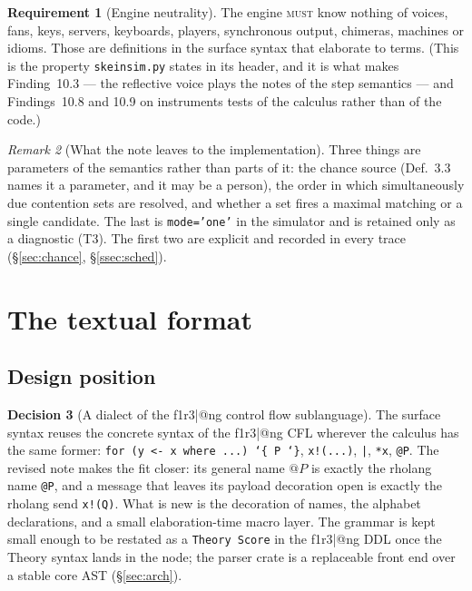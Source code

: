 \documentclass[11pt,a4paper]{article}
\theoremstyle{definition}
\newtheorem{requirement}{Requirement}[section]
\newtheorem{decision}[requirement]{Decision}
\theoremstyle{remark}
\newtheorem{remark}[requirement]{Remark}
\newcommand{\MUST}{\textsc{must}}
\begin{document}
\begin{requirement}[Engine neutrality]\label{req:neutral}
The engine \MUST{} know nothing of voices, fans, keys, servers, keyboards,
players, synchronous output, chimeras, machines or idioms. Those are definitions
in the surface syntax that elaborate to terms. (This is the property
\texttt{skeinsim.py} states in its header, and it is what makes Finding~10.3
--- the reflective voice plays the notes of the step semantics --- and
Findings~10.8 and 10.9 on instruments tests of the calculus rather than of the
code.)
\end{requirement}

\begin{remark}[What the note leaves to the implementation]
Three things are parameters of the semantics rather than parts of it: the chance
source (Def.~3.3 names it a parameter, and it may be a person), the order in
which simultaneously due contention sets are resolved, and whether a set fires
a maximal matching or a single candidate. The last is \texttt{mode='one'} in the
simulator and is retained only as a diagnostic (T3). The first two are explicit
and recorded in every trace (\S\ref{sec:chance}, \S\ref{ssec:sched}).
\end{remark}

\section{The textual format}\label{sec:syntax}

\subsection{Design position}

\begin{decision}[A dialect of the f1r3|@ng control flow sublanguage]\label{dec:dialect}
The surface syntax reuses the concrete syntax of the f1r3|@ng CFL wherever the
calculus has the same former: \texttt{for (y <- x where ...) \char`\{ P \char`\}},
\texttt{x!(...)}, \texttt{|}, \texttt{*x}, \texttt{@P}. The revised note makes
the fit closer: its general name $@P$ is exactly the rholang name \texttt{@P},
and a message that leaves its payload decoration open is exactly the rholang
send \texttt{x!(Q)}. What is new is the decoration of names, the alphabet
declarations, and a small elaboration-time macro layer. The grammar is kept
small enough to be restated as a \texttt{Theory Score} in the f1r3|@ng DDL once
the Theory syntax lands in the node; the parser crate is a replaceable front end
over a stable core AST (\S\ref{sec:arch}).
\end{decision}
\end{document}

